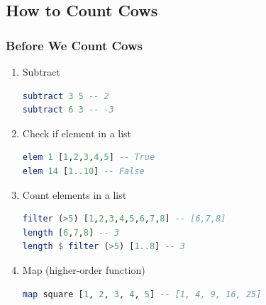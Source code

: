\documentclass[10pt]{beamer}
\begin{document}

\subsection{How to Count Cows}

\begin{frame}[fragile]
\frametitle{Before We Count Cows}
\begin{enumerate}[<+->]
    \item Subtract\\%
    \begin{lstlisting}[language=Haskell,numbers=none]
subtract 3 5 -- 2    
subtract 6 3 -- -3
    \end{lstlisting}
    \item Check if element in a list\\%
    \begin{lstlisting}[language=Haskell,numbers=none]
elem 1 [1,2,3,4,5] -- True
elem 14 [1..10] -- False
    \end{lstlisting}
    
    \item Count elements in a list\\%
    \begin{lstlisting}[language=Haskell,numbers=none]
filter (>5) [1,2,3,4,5,6,7,8] -- [6,7,8]
length [6,7,8] -- 3
length $ filter (>5) [1..8] -- 3
    \end{lstlisting}
    
    \item Map (higher-order function)\\%
    \begin{lstlisting}[language=Haskell,numbers=none]
map square [1, 2, 3, 4, 5] -- [1, 4, 9, 16, 25]
    \end{lstlisting}
\end{enumerate}
    
\end{frame}


\end{document}

